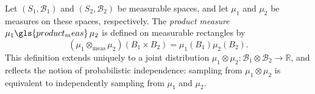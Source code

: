 \begin{definition} 
   Let $(S_1, \mathcal{B}_1)$ and $(S_2, \mathcal{B}_2)$ be measurable spaces, and let $\mu_1$ and $\mu_2$ be measures on these spaces, respectively. The \emph{product measure} $\mu_1 \gls{product_meas} \, \mu_2$ is  defined on measurable rectangles by
$$
(\mu_1 \otimes_{\text{meas}} \mu_2)(B_1 \times B_2) = \mu_1(B_1)\mu_2(B_2).
$$
This definition extends uniquely to a joint distribution $\mu_1 \otimes \mu_2: \mathcal{B}_1 \otimes \mathcal{B}_2 \to \mathbb{R}$, and reflects the notion of probabilistic independence: sampling from $\mu_1 \otimes \mu_2$ is equivalent to independently sampling from $\mu_1$ and $\mu_2$.
\end{definition}

\begin{comment}
\begin{definition}
Let $(S, \mathcal{B}_S)$ and $(T, \mathcal{B}_T)$ be measurable spaces. A \emph{Markov kernel} is a mapping $P : S \times \mathcal{B}_T \to [0,1]$
satisfying the following two properties:
\begin{enumerate}
    \item For each fixed $s \in S$, the function $P(s, \cdot) : \mathcal{B}_T \to [0,1]$ is a probability measure on $(T, \mathcal{B}_T)$.
    \item For each fixed $A \in \mathcal{B}_T$, the function $P(\cdot, A) : S \to [0,1]$ is a measurable function on $(S, \mathcal{B}_S)$.
\end{enumerate}
\end{definition}



By a slight abuse of terminology, we will also refer to a mapping $ P' : S \to (\mathcal{B}_T \to [0,1]), \, P'(s)=\mu $, as a Markov kernel, when there exists a Markov kernel $ P : S \times \mathcal{B}_T \to [0,1], \, P(s,A)=\mu (A) $  for all $s \in S $ and $A \in \mathcal{B}_T$.

\begin{definition}
  Given a measure $\mu$ on $S$ and a Markov kernel $P: S \times \mathcal{B}_T \to [0,1]$, we can define the \emph{pushforward} of $\mu$   under the Markov kernel $P$  as:
$$
P_*(\mu)(B) = \int_S P(s, B) \, \mu(ds), \quad \forall B \in \mathcal{B}_T.
$$
\end{definition}

Any measurable function \( f : (S, \mathcal{B}_S) \to (T, \mathcal{B}_T) \) induces a simple Markov kernel $ s \mapsto \delta_{f(s)} $. As a result,  the usual definition of the pushforward measure (Definition \ref{def:pushforward_meas_1}) becomes a special case of the general formulation defined above.

\end{comment}

